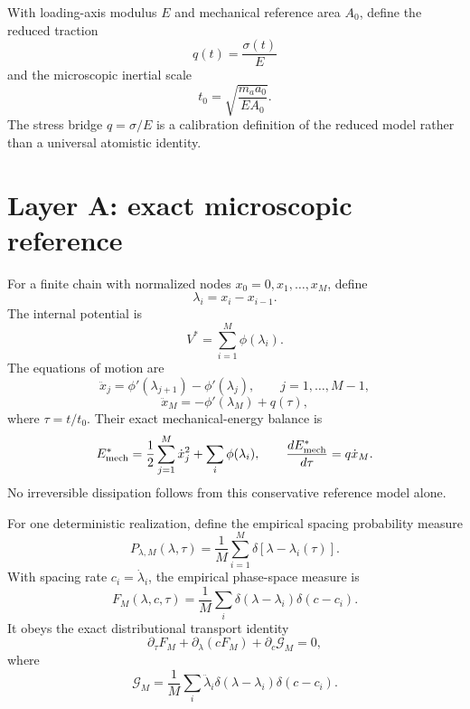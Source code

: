 \documentclass[11pt]{article}
\begin{document}
With loading-axis modulus $E$ and mechanical reference area $A_0$, define the reduced traction
\begin{equation}
q(t)=\frac{\sigma(t)}{E}
\end{equation}
and the microscopic inertial scale
\begin{equation}
t_0=\sqrt{\frac{m_a a_0}{EA_0}}.
\label{eq:t0}
\end{equation}
The stress bridge $q=\sigma/E$ is a calibration definition of the reduced model rather than a universal atomistic identity.

\section{Layer A: exact microscopic reference}
For a finite chain with normalized nodes $x_0=0,x_1,\ldots,x_M$, define
\begin{equation}
\lambda_i=x_i-x_{i-1}.
\end{equation}
The internal potential is
\begin{equation}
V^*=\sum_{i=1}^{M}\phi(\lambda_i).
\end{equation}
The equations of motion are
\begin{equation}
\ddot x_j=\phi'(\lambda_{j+1})-\phi'(\lambda_j),
\qquad j=1,\ldots,M-1,
\end{equation}
\begin{equation}
\ddot x_M=-\phi'(\lambda_M)+q(\tau),
\end{equation}
where $\tau=t/t_0$. Their exact mechanical-energy balance is
\begin{equation}
E_{\rm mech}^*=\frac12\sum_{j=1}^{M}\dot x_j^2+\sum_i\phi(\lambda_i),
\qquad
\frac{dE_{\rm mech}^*}{d\tau}=q\dot x_M.
\label{eq:energy}
\end{equation}
No irreversible dissipation follows from this conservative reference model alone.

For one deterministic realization, define the empirical spacing probability measure
\begin{equation}
P_{\lambda,M}(\lambda,\tau)
=\frac1M\sum_{i=1}^{M}\delta[\lambda-\lambda_i(\tau)].
\label{eq:empiricalP}
\end{equation}
With spacing rate $c_i=\dot\lambda_i$, the empirical phase-space measure is
\begin{equation}
F_M(\lambda,c,\tau)
=\frac1M\sum_i\delta(\lambda-\lambda_i)\delta(c-c_i).
\end{equation}
It obeys the exact distributional transport identity
\begin{equation}
\partial_\tau F_M+\partial_\lambda(cF_M)+\partial_c\mathcal G_M=0,
\end{equation}
where
\begin{equation}
\mathcal G_M=\frac1M\sum_i\ddot\lambda_i
\delta(\lambda-\lambda_i)\delta(c-c_i).
\end{equation}
\end{document}
